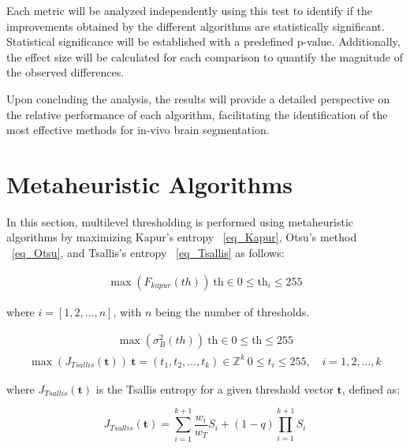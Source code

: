 \documentclass{elsarticle}
\begin{document}
Each metric will be analyzed independently using this test to identify if the improvements obtained by the different algorithms are statistically significant. Statistical significance will be established with a predefined p-value. Additionally, the effect size will be calculated for each comparison to quantify the magnitude of the observed differences.

Upon concluding the analysis, the results will provide a detailed perspective on the relative performance of each algorithm, facilitating the identification of the most effective methods for in-vivo brain segmentation.


\section{Metaheuristic Algorithms} \label{sec:mh} 

In this section, multilevel thresholding is performed using metaheuristic algorithms by maximizing Kapur's entropy ~\ref{eq_Kapur}, Otsu's method ~\ref{eq_Otsu}, and Tsallis's entropy ~\ref{eq_Tsallis} as follows:

\begin{equation}
\begin{gathered}
\max(F_{kapur}(th)) \
\text{th} \in 0 \leq \text{th}_i \leq 255
\end{gathered}
\label{eq_Kapur}
\end{equation}

\noindent 
where $i=[1,2,...,n]$, with $n$ being the number of thresholds.

\begin{equation}
\begin{gathered}
\max(\sigma_B^2(th)) \
\text{th} \in 0 \leq \text{th} \leq 255
\end{gathered}
\label{eq_Otsu}
\end{equation}
\begin{equation}
\begin{gathered}
\max(J_{Tsallis}(\mathbf{t})) \
\mathbf{t} = (t_1, t_2, \dots, t_k) \in \mathbb{Z}^k \
0 \leq t_i \leq 255, \quad i = 1, 2, \dots, k
\end{gathered}
\label{eq_Tsallis}
\end{equation}

\noindent 
where $J_{Tsallis}(\mathbf{t})$ is the Tsallis entropy for a given threshold vector $\mathbf{t}$, defined as:

\begin{equation}
J_{Tsallis}(\mathbf{t}) = \sum_{i=1}^{k+1} \frac{w_i}{w_T} S_i + (1-q) \prod_{i=1}^{k+1} S_i
\end{equation}
\end{document}
